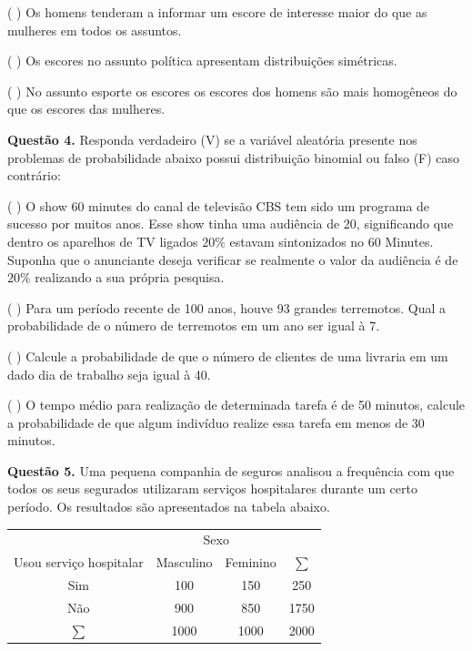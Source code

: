 \documentclass[
]{article}
\begin{document}
( \hspace{0,5cm} ) Os homens tenderam a informar um escore de interesse
maior do que as mulheres em todos os assuntos.

( \hspace{0,5cm} ) Os escores no assunto política apresentam
distribuições simétricas.

( \hspace{0,5cm} ) No assunto esporte os escores os escores dos homens
são mais homogêneos do que os escores das mulheres.

\vspace{1.0cm}

\textbf{Questão 4.} Responda verdadeiro (V) se a variável aleatória
presente nos problemas de probabilidade abaixo possui distribuição
binomial ou falso (F) caso contrário:

( \hspace{0,5cm} ) O show 60 minutes do canal de televisão CBS tem sido
um programa de sucesso por muitos anos. Esse show tinha uma audiência de
20, significando que dentro os aparelhos de TV ligados \(20\%\) estavam
sintonizados no 60 Minutes. Suponha que o anunciante deseja verificar se
realmente o valor da audiência é de \(20\%\) realizando a sua própria
pesquisa.

( \hspace{0,5cm} ) Para um período recente de 100 anos, houve 93 grandes
terremotos. Qual a probabilidade de o número de terremotos em um ano ser
igual à 7.

( \hspace{0,5cm} ) Calcule a probabilidade de que o número de clientes
de uma livraria em um dado dia de trabalho seja igual à 40.

( \hspace{0,5cm} ) O tempo médio para realização de determinada tarefa é
de 50 minutos, calcule a probabilidade de que algum indivíduo realize
essa tarefa em menos de 30 minutos.

\newpage

\textbf{Questão 5.} Uma pequena companhia de seguros analisou a
frequência com que todos os seus segurados utilizaram serviços
hospitalares durante um certo período. Os resultados são apresentados na
tabela abaixo.

\begin{center}
\begin{tabular}{cccc}
\hline
  & \multicolumn{2}{c}{Sexo} & \\
\cline{2-3}
Usou serviço hospitalar & Masculino & Feminino & $\sum$ \\ \hline
Sim     & 100 & 150 & 250   \\
Não    & 900 & 850 & 1750  \\ \hline
$\sum$  & 1000 & 1000& 2000  \\ \hline
\end{tabular}
\end{center}
\end{document}
